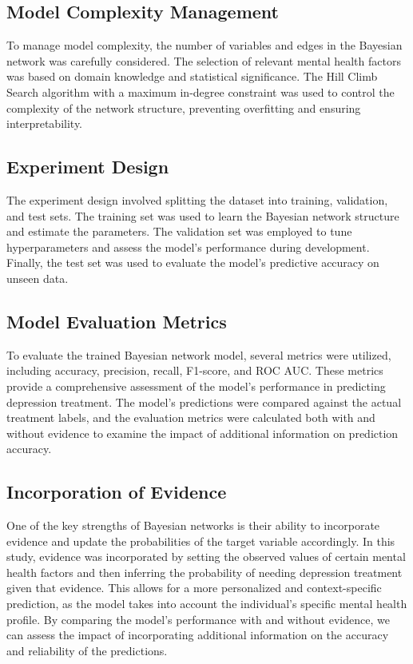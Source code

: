 \documentclass[conference]{IEEEtran}
\begin{document}
\subsection{Model Complexity Management}
To manage model complexity, the number of variables and edges in the Bayesian network was carefully considered. The selection of relevant mental health factors was based on domain knowledge and statistical significance. The Hill Climb Search algorithm with a maximum in-degree constraint was used to control the complexity of the network structure, preventing overfitting and ensuring interpretability.

\subsection{Experiment Design}
The experiment design involved splitting the dataset into training, validation, and test sets. The training set was used to learn the Bayesian network structure and estimate the parameters. The validation set was employed to tune hyperparameters and assess the model's performance during development. Finally, the test set was used to evaluate the model's predictive accuracy on unseen data.

\subsection{Model Evaluation Metrics}
To evaluate the trained Bayesian network model, several metrics were utilized, including accuracy, precision, recall, F1-score, and ROC AUC. These metrics provide a comprehensive assessment of the model's performance in predicting depression treatment. The model's predictions were compared against the actual treatment labels, and the evaluation metrics were calculated both with and without evidence to examine the impact of additional information on prediction accuracy.

\subsection{Incorporation of Evidence}
One of the key strengths of Bayesian networks is their ability to incorporate evidence and update the probabilities of the target variable accordingly. In this study, evidence was incorporated by setting the observed values of certain mental health factors and then inferring the probability of needing depression treatment given that evidence. This allows for a more personalized and context-specific prediction, as the model takes into account the individual's specific mental health profile. By comparing the model's performance with and without evidence, we can assess the impact of incorporating additional information on the accuracy and reliability of the predictions.
\end{document}
